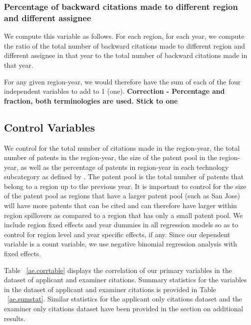 \documentclass[12pt,letterpaper]{article}
\begin{document}
\subsubsection{Percentage of backward citations made to different region and different assignee}
We compute this variable as follows. For each region, for each year, we compute the ratio of the total number of backward citations made to different region and different assignee in that year to the total number of backward citations made in that year.\par

For any given region-year, we would therefore have the sum of each of the four independent variables to add to 1 (one). \textbf{Correction - Percentage and fraction, both terminologies are used. Stick to one}

\subsection{Control Variables}
We control for the total number of citations made in the region-year, the total number of patents in the region-year, the size of the patent pool in the region-year, as well as the percentage of patents in region-year in each technology subcategory as defined by \cite*{Hall2001a}. The patent pool is the total number of patents that belong to a region up to the previous year. It is important to control for the size of the patent pool as  regions that have a larger patent pool (such as San Jose) will have more patents that can be cited and can therefore have larger within region spillovers as compared to a region that has only a small patent pool. We include region fixed effects and year dummies in all regression models so as to control for region level and year specific effects, if any. Since our dependent variable is a count variable, we use negative binomial regression analysis with fixed effects. \par

Table ~\ref{ae.corrtable} displays the correlation of our primary variables in the dataset of applicant and examiner citations. Summary statistics for the variables in the dataset of applicant and examiner citations is provided in Table ~\ref{ae.sumstat}. Similar statistics for the applicant only citations dataset and the examiner only citations dataset have been provided in the section on additional results.
\end{document}

